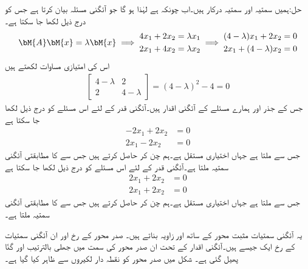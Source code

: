 حل:ہمیں سمتیہ  اور سمتیہ  درکار ہیں۔اب چونکہ  ہے لہٰذا  ہو گا جو آئگنی مسئلہ بیان کرتا ہے جس کو درج ذیل لکھا جا سکتا ہے۔
\begin{gather*}
\bM{A}\bM{x}=\lambda \bM{x} \implies \begin{aligned}4x_1+2x_2&=\lambda x_1\\2x_1+4x_2&=\lambda x_2 \end{aligned}\implies 
\begin{aligned}(4-\lambda)x_1+2x_2&=0\\2x_1+(4-\lambda)x_2&=0 \end{aligned}
\end{gather*}
اس کی امتیازی مساوات لکھتے ہیں
\begin{align*}
\begin{bmatrix} 4-\lambda& 2\\2&4-\lambda \end{bmatrix}=(4-\lambda)^2-4=0
\end{align*}
جس کے جذر  اور  ہمارے مسئلے کے آئگنی اقدار ہیں۔آئگنی قدر  کے لئے اس مسئلے کو درج ذیل لکھا جا سکتا ہے
\begin{align*}
-2x_1+2x_2&=0\\2x_1-2x_2&=0
\end{align*}
جس سے  ملتا ہے جہاں  اختیاری مستقل ہے۔ہم  چن کر  حاصل کرتے ہیں جس سے   کا مطابقتی آئگنی سمتیہ  ملتا ہے۔آئگنی قدر  کے لئے اس مسئلے کو درج ذیل لکھا جا سکتا ہے
\begin{align*}
2x_1+2x_2&=0\\2x_1+2x_2&=0
\end{align*}
جس سے  ملتا ہے جہاں  اختیاری مستقل ہے۔ہم  چن کر  حاصل کرتے ہیں جس سے   کا مطابقتی آئگنی سمتیہ  ملتا ہے۔

یہ آئگنی سمتیات مثبت  محور کے ساتھ  اور  زاویہ بناتے ہیں۔ صدر محور کے رخ اور ان آئگنی سمتیات کے رخ ایک جیسے ہیں۔آئگنی اقدار کے تحت ان صدر محور کی سمت میں جھلی بالترتیب  اور  گنّا پھیل گئی ہے۔ شکل  میں صدر محور کو نقطہ دار لکیروں سے ظاہر کیا گیا ہے۔

